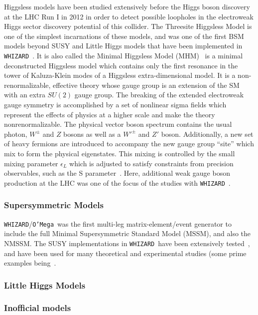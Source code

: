 \documentclass[12pt]{book}
\newcommand{\ttt}[1]{\texttt{#1}}
\newcommand{\whizard}{\ttt{WHIZARD}}
\newcommand{\oMega}{\ttt{O'Mega}}
\begin{document}
Higgsless models have been studied extensively before the Higgs boson
discovery at the LHC Run I in 2012 in order to detect possible
loopholes in the electroweak Higgs sector discovery potential of this
collider. The Threesite Higgsless Model is one of the simplest
incarnations of these models, and was one of the first BSM models
beyond SUSY and Little Higgs models that have been implemented in
\whizard~\cite{Speckner:2010zi}. It is also called the Minimal
Higgsless Model (MHM)~\cite{Chivukula:2006cg} is a  minimal
deconstructed Higgsless model which contains only the first resonance
in  the tower of Kaluza-Klein modes of a Higgsless extra-dimensional
model. It is a non-renormalizable, effective theory whose
gauge group is an extension of the SM with an extra $SU(2)$ gauge
group.  The breaking of the extended electroweak gauge symmetry is
accomplished by a set of nonlinear sigma fields which represent the
effects of physics at a higher scale and make the theory
nonrenormalizable. The physical vector boson spectrum contains the
usual photon, $W^\pm$ and $Z$ bosons as well as a $W'^\pm$ and $Z'$
boson.  Additionally, a new set of heavy fermions are introduced to
accompany the new gauge group ``site'' which mix to form the physical
eigenstates.  This mixing is controlled by the small mixing parameter
$\epsilon_L$ which is adjusted to satisfy constraints from precision
observables, such as the S parameter~\cite{Chivukula:2005xm}.
Here, additional weak gauge boson production at the LHC was
one of the focus of the studies with \whizard~\cite{Ohl:2008ri}.


\subsubsection{Supersymmetric Models}

\whizard/\oMega\ was the first multi-leg matrix-element/event
generator to include the full Minimal Supersymmetric Standard Model
(MSSM), and also the NMSSM. The SUSY implementations in \whizard\ have
been extensively tested~\cite{Ohl:2002jp,Reuter:2009ex}, and have been
used for many theoretical and experimental studies (some prime
examples
being~\cite{Kalinowski:2008fk,Robens:2008sa,Hagiwara:2005wg}.

\subsubsection{Little Higgs Models}

\subsubsection{Inofficial models}
\end{document}
